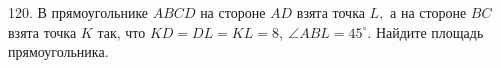120. В прямоугольнике $ABCD$ на стороне $AD$ взята точка $L,$ а на стороне $BC$ взята точка $K$ так, что $KD=DL=KL=8,\ \angle ABL=45^\circ.$ Найдите площадь прямоугольника.\\
